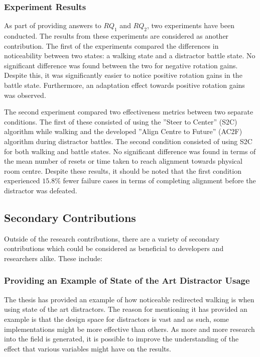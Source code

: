 \subsubsection{Experiment Results}
As part of providing answers to $RQ_1$ and $RQ_2$, two experiments have been conducted. The results from these experiments are considered as another contribution. The first of the experiments compared the differences in noticeability between two states: a walking state and a distractor battle state. No significant difference was found between the two for negative rotation gains. Despite this, it was significantly easier to notice positive rotation gains in the battle state. Furthermore, an adaptation effect towards positive rotation gains was observed.

The second experiment compared two effectiveness metrics between two separate conditions. The first of these consisted of using the ''Steer to Center'' (S2C) algorithm while walking and the developed ''Align Centre to Future'' (AC2F) algorithm during distractor battles. The second condition consisted of using S2C for both walking and battle states. No significant difference was found in terms of the mean number of resets or time taken to reach alignment towards physical room centre. Despite these results, it should be noted that the first condition experienced $15.8\%$ fewer failure cases in terms of completing alignment before the distractor was defeated. 

\subsection{Secondary Contributions}
Outside of the research contributions, there are a variety of secondary contributions which could be considered as beneficial to developers and researchers alike. These include:

\subsubsection{Providing an Example of State of the Art Distractor Usage}
The thesis has provided an example of how noticeable redirected walking is when using state of the art distractors. The reason for mentioning it has provided an example is that the design space for distractors is vast and as such, some implementations might be more effective than others. As more and more research into the field is generated, it is possible to improve the understanding of the effect that various variables might have on the results. 

